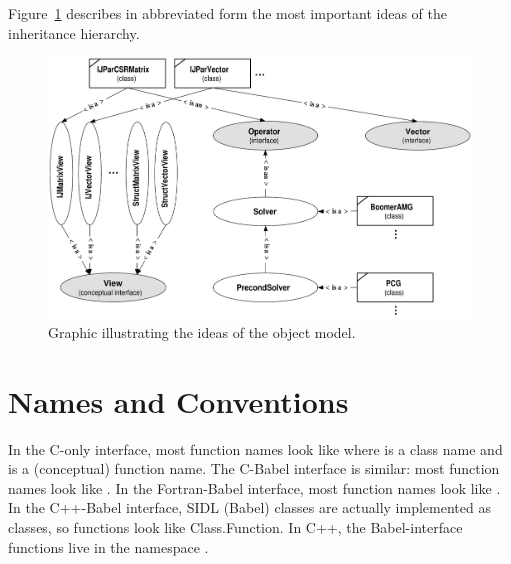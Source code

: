 Figure~\ref{figObjectModel} describes in abbreviated form the most
important ideas of the \hypre{} inheritance hierarchy.


\begin{figure}
\centering
\includegraphics[width=5in]{figObjectModel}
\caption{%
Graphic illustrating the ideas of the object model.}
\label{figObjectModel}
\end{figure}





\section{Names and Conventions}

In the C-only interface, most \hypre{} function names look like
 where  is a class name and
 is a (conceptual) function name.  The C-Babel
interface is similar: most function names look like
.  In the Fortran-Babel interface, most
function names look like .  In the
C++-Babel interface, SIDL (Babel) classes are actually implemented as
classes, so functions look like Class.Function.  In C++, the
Babel-interface functions live in the namespace .

